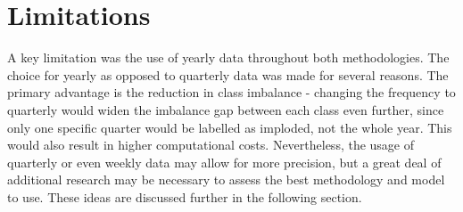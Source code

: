 \documentclass[a4paper]{report}
\begin{document}
\section{Limitations}
A key limitation was the use of yearly data throughout both methodologies. The choice for yearly as opposed to quarterly data was made for several reasons. The primary 
advantage is the reduction in class imbalance - changing the frequency to quarterly would widen the imbalance gap between each class even further, since only one specific quarter 
would be labelled as imploded, not the whole year. This would also result in higher computational costs. Nevertheless, the usage of quarterly or even weekly data may allow for 
more precision, but a great deal of additional research may be necessary to assess the best methodology and model to use. These ideas are discussed further in the following section.
\end{document}
